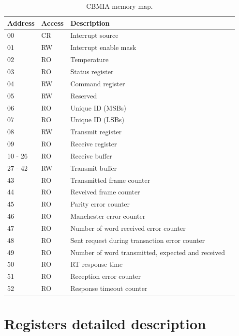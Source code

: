 \documentclass[11pt,a4paper]{article}
\begin{document}
\begin{table}[ht]
  \caption{\label{memory_map} CBMIA memory map.}
  \begin{tabularx}{\textwidth}{|l|l|l|X|}
    \hline
    \textbf{Address} & \textbf{Access} & \textbf{Description}\\
    \hline
    00         & CR  & Interrupt source \\
    01         & RW  & Interrupt enable mask \\
    02         & RO  & Temperature \\
    03         & RO  & Status register \\
    04         & RW  & Command register \\
    05         & RW  & Reserved \\
    06         & RO  & Unique ID (MSBs) \\
    07         & RO  & Unique ID (LSBs) \\
    08         & RW  & Transmit register \\
    09         & RO  & Receive register \\
    10 - 26  & RO    & Receive buffer \\
    27 - 42  & RW    & Transmit buffer \\
    43         & RO  & Transmitted frame counter \\
    44         & RO  & Reveived frame counter \\
    45         & RO  & Parity error counter \\
    46         & RO  & Manchester error counter \\
    47         & RO  & Number of word received error counter \\
    48         & RO  & Sent request during transaction error counter \\
    49         & RO  & Number of word transmitted, expected and received \\
    50         & RO  & RT response time \\
    51         & RO  & Reception error counter \\
    52         & RO  & Response timeout counter \\
    \hline
  \end{tabularx}
\end{table}

\newpage
\section{Registers detailed description}
\end{document}
